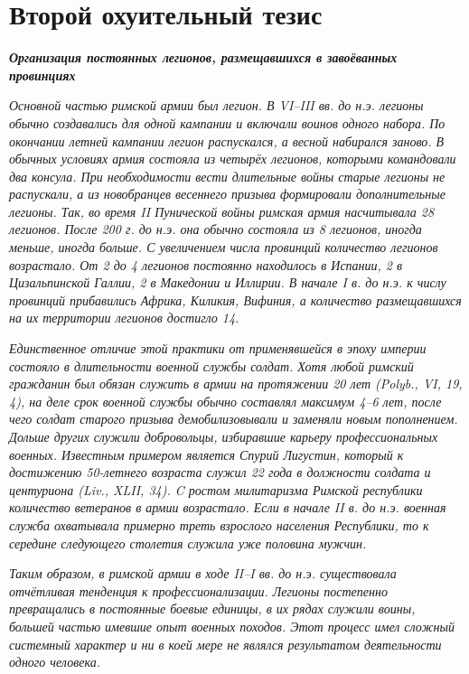 \section{Второй охуительный тезис}
\textbf{\textit{Организация постоянных легионов, размещавшихся в завоёванных провинциях}}

\textit{Основной частью римской армии был легион. В VI–III вв. до н.э. легионы обычно создавались для одной кампании и включали воинов одного набора. По окончании летней кампании легион распускался, а весной набирался заново. В обычных условиях армия состояла из четырёх легионов, которыми командовали два консула. При необходимости вести длительные войны старые легионы не распускали, а из новобранцев весеннего призыва формировали дополнительные легионы. Так, во время II Пунической войны римская армия насчитывала 28 легионов. После 200 г. до н.э. она обычно состояла из 8 легионов, иногда меньше, иногда больше. С увеличением числа провинций количество легионов возрастало. От 2 до 4 легионов постоянно находилось в Испании, 2 в Цизальпинской Галлии, 2 в Македонии и Иллирии. В начале I в. до н.э. к числу провинций прибавились Африка, Киликия, Вифиния, а количество размещавшихся на их территории легионов достигло 14.}


\textit{Единственное отличие этой практики от применявшейся в эпоху империи состояло в длительности военной службы солдат. Хотя любой римский гражданин был обязан служить в армии на протяжении 20 лет (Polyb., VI, 19, 4), на деле срок военной службы обычно составлял максимум 4–6 лет, после чего солдат старого призыва демобилизовывали и заменяли новым пополнением. Дольше других служили добровольцы, избиравшие карьеру профессиональных военных. Известным примером является Спурий Лигустин, который к достижению 50-летнего возраста служил 22 года в должности солдата и центуриона (Liv., XLII, 34). C ростом милитаризма Римской республики количество ветеранов в армии возрастало. Если в начале II в. до н.э. военная служба охватывала примерно треть взрослого населения Республики, то к середине следующего столетия служила уже половина мужчин.}


\textit{Таким образом, в римской армии в ходе II–I вв. до н.э. существовала отчётливая тенденция к профессионализации. Легионы постепенно превращались в постоянные боевые единицы, в их рядах служили воины, большей частью имевшие опыт военных походов. Этот процесс имел сложный системный характер и ни в коей мере не являлся результатом деятельности одного человека.}


